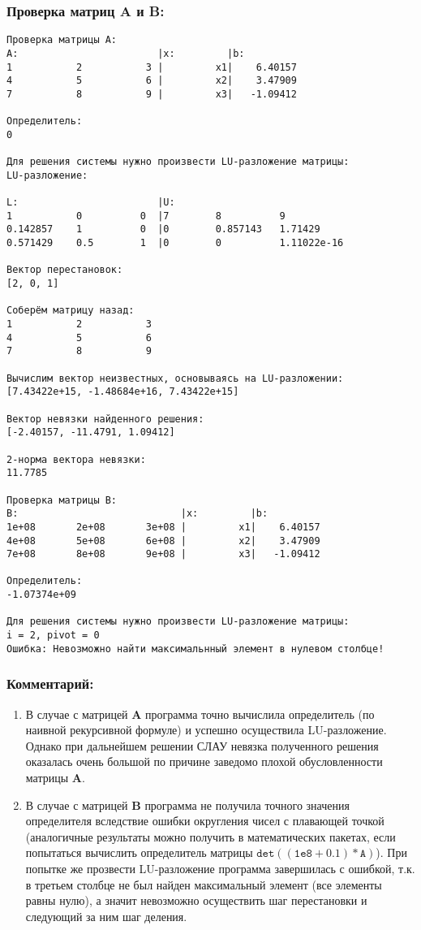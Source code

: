 \subsubsection{Проверка матриц A и B:}
{\singlespacing
\begin{verbatim}
Проверка матрицы A:
A:                        |x:         |b:
1           2           3 |         x1|    6.40157
4           5           6 |         x2|    3.47909
7           8           9 |         x3|   -1.09412

Определитель:
0

Для решения системы нужно произвести LU-разложение матрицы:
LU-разложение:

L:                        |U:
1           0          0  |7        8          9
0.142857    1          0  |0        0.857143   1.71429
0.571429    0.5        1  |0        0          1.11022e-16

Вектор перестановок:
[2, 0, 1]

Соберём матрицу назад:
1           2           3
4           5           6
7           8           9

Вычислим вектор неизвестных, основываясь на LU-разложении:
[7.43422e+15, -1.48684e+16, 7.43422e+15]

Вектор невязки найденного решения:
[-2.40157, -11.4791, 1.09412]

2-норма вектора невязки:
11.7785

Проверка матрицы B:
B:                            |x:         |b:
1e+08       2e+08       3e+08 |         x1|    6.40157
4e+08       5e+08       6e+08 |         x2|    3.47909
7e+08       8e+08       9e+08 |         x3|   -1.09412

Определитель:
-1.07374e+09

Для решения системы нужно произвести LU-разложение матрицы:
i = 2, pivot = 0
Ошибка: Невозможно найти максимальнный элемент в нулевом столбце!
\end{verbatim}}
\subsubsection{Комментарий:}
\begin{enumerate}
    \item В случае с матрицей $\mathbf{A}$ программа точно вычислила определитель (по наивной рекурсивной формуле) и успешно осуществила LU-разложение. Однако при дальнейшем решении СЛАУ невязка полученного решения оказалась очень большой по причине заведомо плохой обусловленности матрицы  $\mathbf{A}$.

    \item В случае с матрицей $\mathbf{B}$ программа не получила точного значения определителя вследствие ошибки округления чисел с плавающей точкой (аналогичные результаты можно получить в математических пакетах, если попытаться вычислить определитель матрицы $\mathtt{det((1e8+0.1) * A)}$). При попытке же прозвести LU-разложение программа завершилась с ошибкой, т.к. в третьем столбце не был найден максимальный элемент (все элементы равны нулю), а значит невозможно осуществить шаг перестановки и следующий за ним шаг деления.
\end{enumerate}

